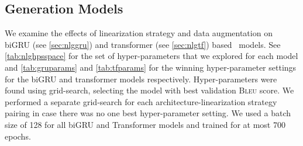 
\subsection{Generation Models}
We examine the effects of linearization strategy and data augmentation
on biGRU (see \autoref{sec:nlggru})
and transformer (see \autoref{sec:nlgtf}) based \sequencetosequence~models.
See \autoref{tab:nlghpsspace} for the set of hyper-parameters that we explored for
each model and \autoref{tab:gruparams} and \autoref{tab:tfparams} for the winning hyper-parameter settings for the biGRU and transformer models respectively.
Hyper-parameters were found using grid-search, selecting the model
with best validation \textsc{Bleu} score. We performed a separate
grid-search for each architecture-linearization strategy pairing in case
there was no one best hyper-parameter setting.
We used a batch size of 128 for all biGRU and
Transformer models and trained for at most 700 epochs.







%
%
%
\newcommand{\utt}{\ensuremath{\mathbf{y}}}
\newcommand{\uttVocab}{\ensuremath{\mathcal{W}}}
\newcommand{\da}{\ensuremath{a}}
\newcommand{\inseq}{\mathbf{x}}
\newcommand{\Attrs}{\ensuremath{\mathcal{V}}}
\newcommand{\inSize}{m}
\newcommand{\outSize}{n}

\newcommand{\mmhAttn}{\operatorname{maskedMHAttn}}
\newcommand{\mhAttn}{\operatorname{MHAttn}}

\newcommand{\mrEmb}{\mathbf{W}}
\newcommand{\uttEmb}{\mathbf{V}}
\newcommand{\decInput}{\mathbf{G}}
\newcommand{\decInputi}{\mathbf{g}_i}


\newcommand{\tfeA}{\boldsymbol{\check{\encInput}}^{(i)}}
\newcommand{\tfeB}{\boldsymbol{\bar{\encInput}}^{(i)}}
\newcommand{\tfeC}{\boldsymbol{\hat{\encInput}}^{(i)}}
\newcommand{\tfeD}{\boldsymbol{\dot{\encInput}}^{(i)}}
\newcommand{\tfeE}{\boldsymbol{\ddot{\encInput}}^{(i)}}

